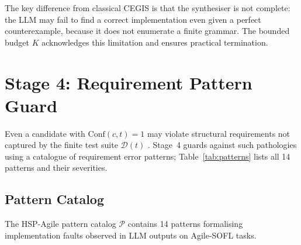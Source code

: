The key difference from classical CEGIS is that the synthesiser is not
complete: the LLM may fail to find a correct implementation even given a
perfect counterexample, because it does not enumerate a finite grammar.
The bounded budget $K$ acknowledges this limitation and ensures practical
termination.

\section{Stage 4: Requirement Pattern Guard}
\label{sec:method:guard}

Even a candidate with $\mathrm{Conf}(c, t) = 1$ may violate structural
requirements not captured by the finite test suite $\mathcal{D}(t)$ \citep{hovemeyer2004findbugs, li2023iet}.
Stage~4 guards against such pathologies using a catalogue of requirement error
patterns; Table~\ref{tab:patterns} lists all 14 patterns and their severities.

\subsection{Pattern Catalog}
\label{subsec:method:catalog}

The HSP-Agile pattern catalog $\mathcal{P}$ contains 14 patterns formalising
implementation faults observed in LLM outputs on Agile-SOFL tasks.

